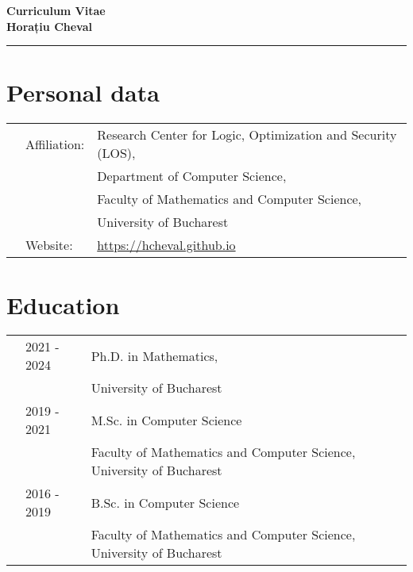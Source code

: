 \documentclass[letterpaper,11pt,oneside]{article}
\begin{document}

\noindent  \huge{\textbf{Curriculum Vitae \\ Horațiu Cheval}}  \\
\vspace{-2ex}
\hrule
\normalsize




\vspace{1em}



\noindent
\section{Personal data}
\normalsize 
\begin{tabular}{@{} l l l}
    &Affiliation:& Research Center for Logic, Optimization and Security (LOS), \\ 
    && Department of Computer Science, \\ 
    && Faculty of Mathematics and Computer Science, \\ 
    && University of Bucharest \\ 
    &Website:& \url{https://hcheval.github.io}
\end{tabular}


\noindent
\section{Education} 
\normalsize
\begin{tabular}{@{} l l l}
    & 2021 - 2024 & Ph.D. in Mathematics, \\ 
    &                & University of Bucharest \\
    & 2019 - 2021 & M.Sc. in Computer Science \\  
    &                & Faculty of Mathematics and Computer Science, University of Bucharest \\
    & 2016 - 2019    & B.Sc. in Computer Science \\
    &                & Faculty of Mathematics and Computer Science, University of Bucharest \\

\end{tabular}
\end{document}
